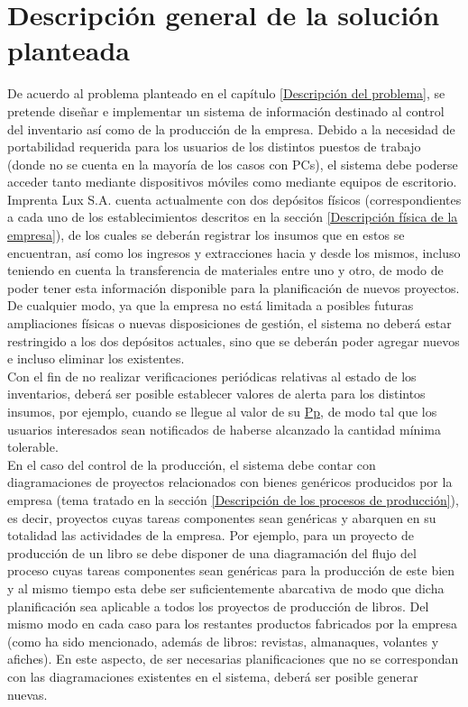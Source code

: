 \documentclass[a4paper, 12pt,twoside]{report}  %
\numberwithin{equation}{subsection} %
\begin{document}
\section{Descripción general de la solución planteada}
De acuerdo al problema planteado en el capítulo \ref{Descripción del problema}, se pretende diseñar e implementar un sistema de información destinado al control del inventario así como de la producción de la empresa. Debido a la necesidad de portabilidad requerida para los usuarios de los distintos puestos de trabajo (donde no se cuenta en la mayoría de los casos con PCs), el sistema debe poderse acceder tanto mediante dispositivos móviles como mediante equipos de escritorio.\\
\indent Imprenta Lux S.A. cuenta actualmente con dos depósitos físicos (correspondientes a cada uno de los establecimientos descritos en la sección \ref{Descripción física de la empresa}), de los cuales se deberán registrar los insumos que en estos se encuentran, así como los ingresos y extracciones hacia y desde los mismos, incluso teniendo en cuenta la transferencia de materiales entre uno y otro, de modo de poder tener esta información disponible para la planificación de nuevos proyectos. De cualquier modo,  ya que la empresa no está limitada a posibles futuras ampliaciones físicas o nuevas disposiciones de gestión, el sistema no deberá estar restringido a los dos depósitos actuales, sino que se deberán poder agregar nuevos e incluso eliminar los existentes.\\
\indent  Con el fin de no realizar verificaciones periódicas relativas al estado de los inventarios, deberá ser posible establecer valores de alerta para los distintos insumos, por ejemplo, cuando se llegue al valor de su \hyperlink{Pp}{Pp}, de modo tal que los usuarios interesados sean notificados de haberse alcanzado la cantidad mínima tolerable.\\
\indent En el caso del control de la producción, el sistema debe contar con diagramaciones de proyectos relacionados con bienes genéricos producidos por la empresa (tema tratado en la sección \ref{Descripción de los procesos de producción}), es decir, proyectos cuyas tareas componentes sean genéricas y abarquen en su totalidad las actividades de la empresa. Por ejemplo, para un proyecto de producción de un libro se debe disponer de una diagramación del flujo del proceso cuyas tareas componentes sean genéricas para la producción de este bien y al mismo tiempo esta debe ser suficientemente abarcativa de modo que dicha planificación sea aplicable a todos los proyectos de producción de libros. Del mismo modo en cada caso para los restantes productos fabricados por la empresa (como ha sido mencionado, además de libros: revistas, almanaques, volantes y afiches). En este aspecto, de ser necesarias planificaciones que no se correspondan con las diagramaciones existentes en el sistema, deberá ser posible generar nuevas.\\
\end{document}
